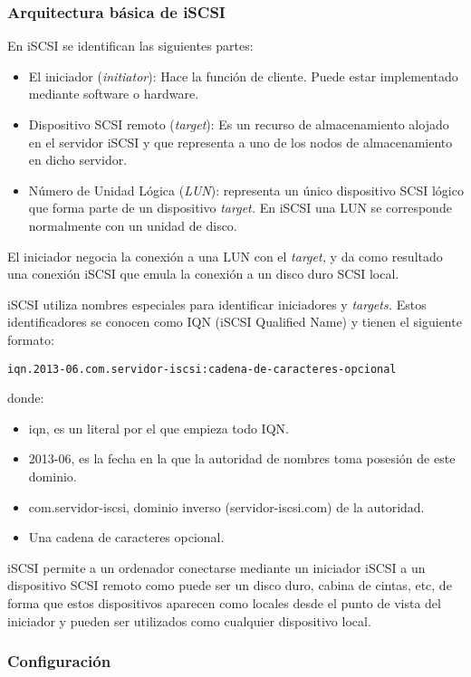 \documentclass[spanisheDIVcalc,twoside,parskip-,pointlessnumbers,final]{scrbook}
\begin{document}
\subsubsection{Arquitectura básica de iSCSI}

En iSCSI se identifican las siguientes partes:
\begin{itemize}
\item El iniciador (\emph{initiator}): Hace la función de cliente. Puede
estar implementado mediante software o hardware.
\item Dispositivo SCSI remoto (\emph{target}): Es un recurso de almacenamiento
alojado en el servidor iSCSI y que representa a uno de los nodos de
almacenamiento en dicho servidor. 
\item Número de Unidad Lógica (\emph{LUN}): representa un único dispositivo
SCSI lógico que forma parte de un dispositivo \emph{target. }En iSCSI
una LUN se corresponde normalmente con un unidad de disco.
\end{itemize}
El iniciador negocia la conexión a una LUN con el \emph{target, }y
da como resultado una conexión iSCSI que emula la conexión a un disco
duro SCSI local. 

iSCSI utiliza nombres especiales para identificar iniciadores y \emph{targets.
}Estos identificadores se conocen como IQN (iSCSI Qualified Name)
y tienen el siguiente formato:

\begin{lstlisting}
iqn.2013-06.com.servidor-iscsi:cadena-de-caracteres-opcional
\end{lstlisting}


donde:
\begin{itemize}
\item iqn, es un literal por el que empieza todo IQN.
\item 2013-06, es la fecha en la que la autoridad de nombres toma posesión
de este dominio.
\item com.servidor-iscsi, dominio inverso (servidor-iscsi.com) de la autoridad.
\item Una cadena de caracteres opcional.
\end{itemize}
iSCSI permite a un ordenador conectarse mediante un iniciador iSCSI
a un dispositivo SCSI remoto como puede ser un disco duro, cabina
de cintas, etc, de forma que estos dispositivos aparecen como locales
desde el punto de vista del iniciador y pueden ser utilizados como
cualquier dispositivo local.


\subsubsection{Configuración}
\end{document}
